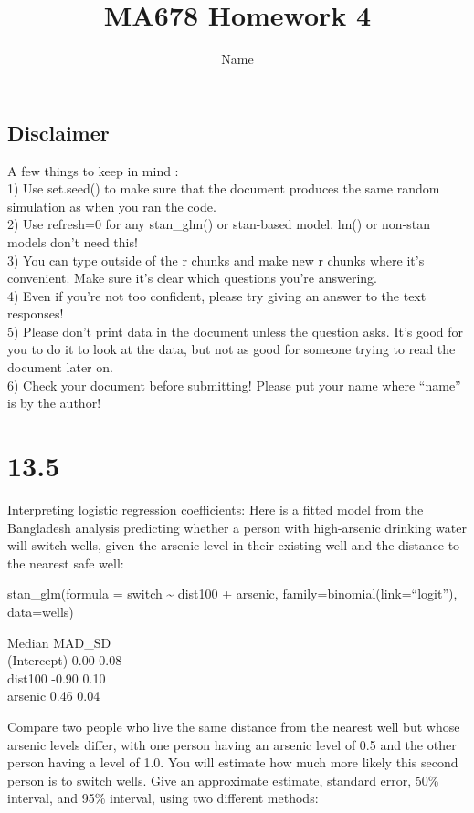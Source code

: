 \documentclass[
]{article}
\title{MA678 Homework 4}
\author{Name}
\date{}
\begin{document}
\maketitle

\hypertarget{disclaimer}{%
\subsection{Disclaimer}\label{disclaimer}}

A few things to keep in mind :\\
1) Use set.seed() to make sure that the document produces the same
random simulation as when you ran the code.\\
2) Use refresh=0 for any stan\_glm() or stan-based model. lm() or
non-stan models don't need this!\\
3) You can type outside of the r chunks and make new r chunks where it's
convenient. Make sure it's clear which questions you're answering.\\
4) Even if you're not too confident, please try giving an answer to the
text responses!\\
5) Please don't print data in the document unless the question asks.
It's good for you to do it to look at the data, but not as good for
someone trying to read the document later on.\\
6) Check your document before submitting! Please put your name where
``name'' is by the author!

\hypertarget{section}{%
\section{13.5}\label{section}}

Interpreting logistic regression coefficients: Here is a fitted model
from the Bangladesh analysis predicting whether a person with
high-arsenic drinking water will switch wells, given the arsenic level
in their existing well and the distance to the nearest safe well:

stan\_glm(formula = switch \textasciitilde{} dist100 + arsenic,
family=binomial(link=``logit''), data=wells)

Median MAD\_SD\\
(Intercept) 0.00 0.08\\
dist100 -0.90 0.10\\
arsenic 0.46 0.04

Compare two people who live the same distance from the nearest well but
whose arsenic levels differ, with one person having an arsenic level of
0.5 and the other person having a level of 1.0. You will estimate how
much more likely this second person is to switch wells. Give an
approximate estimate, standard error, 50\% interval, and 95\% interval,
using two different methods:
\end{document}
